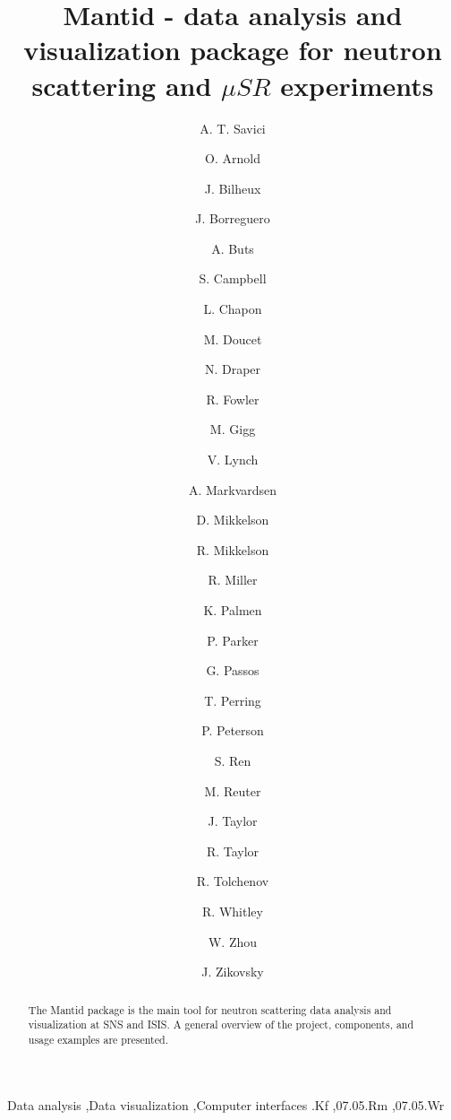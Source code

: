 \documentclass{elsarticle}
\begin{document}
\begin{frontmatter}



\title{Mantid - data analysis and visualization package for neutron scattering and $\mu SR$ experiments}


\author[ornl]{A. T. Savici}
\author[tesella]{O. Arnold}
\author[ornl]{J. Bilheux}
\author[ornl]{J. Borreguero}
\author[isis]{A. Buts}
\author[ornl]{S. Campbell}
\author[isis]{L. Chapon}
\author[ornl]{M. Doucet}
\author[tesella]{N. Draper}
\author[isis]{R. Fowler}
\author[tesella]{M. Gigg}
\author[ornl]{V. Lynch}
\author[isis]{A. Markvardsen}
\author[ornl]{D. Mikkelson}
\author[ornl]{R. Mikkelson}
\author[ornl]{R. Miller}
\author[isis]{K. Palmen}
\author[isis]{P. Parker}
\author[isis]{G. Passos}
\author[isis]{T. Perring}
\author[ornl]{P. Peterson}
\author[ornl]{S. Ren}
\author[ornl]{M. Reuter}
\author[isis]{J. Taylor}
\author[tesella]{R. Taylor}
\author[tesella]{R. Tolchenov}
\author[isis]{R. Whitley}
\author[ornl]{W. Zhou}
\author[ornl]{J. Zikovsky}

\address[ornl]{NDAV, Oak Ridge National Laboratory, Oak Ridge, TN, USA}
\address[tesella]{Tesella, UK}
\address[isis]{ISIS, UK}

\begin{abstract}
The Mantid  package is the main tool for neutron scattering data analysis and visualization at SNS and ISIS. A general overview of the project, components, and usage examples are presented. 
\end{abstract}

\begin{keyword}
Data analysis \sep Data visualization \sep Computer interfaces
.Kf 	%
\sep 07.05.Rm 	%
\sep 07.05.Wr 	%
\end{keyword}
\end{frontmatter}
\end{document}
